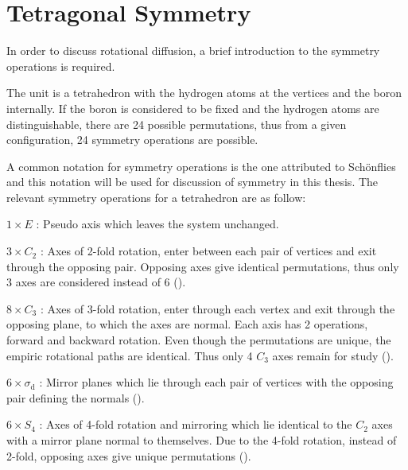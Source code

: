 \section{Tetragonal Symmetry}
\label{sec:symmetry}
In order to discuss rotational diffusion, a brief introduction to the  symmetry operations is required.

The  unit is a tetrahedron with the hydrogen atoms at the vertices and the boron internally.
If the boron is considered to be fixed and the hydrogen atoms are distinguishable, there are 24 possible permutations, thus from a given configuration, 24 symmetry operations are possible.

A common notation for symmetry operations is the one attributed to Sch\"onflies~\cite{schonflies-notation-1889} and this notation will be used for discussion of symmetry in this thesis. %
The relevant symmetry operations for a tetrahedron are as follow:
\bit
\item $1 \times E$ : Pseudo axis which leaves the system unchanged.
\item $3 \times C_2$ : Axes of 2-fold rotation, enter between each pair of vertices and exit through the opposing pair.
Opposing axes give identical permutations, thus only 3 axes are considered instead of 6 ().
\item $8 \times C_3$ : Axes of 3-fold rotation, enter through each vertex and exit through the opposing plane, to which the axes are normal. Each axis has 2 operations, forward and backward rotation.
Even though the permutations are unique, the empiric rotational paths are identical.
Thus only 4 $C_3$ axes remain for study ().
\item $6 \times \sigma_\text{d}$ : Mirror planes which lie through each pair of vertices with the opposing pair defining the normals ().
\item $6 \times S_4$ : Axes of 4-fold rotation and mirroring which lie identical to the $C_2$ axes with a mirror plane normal to themselves. Due to the 4-fold rotation, instead of 2-fold, opposing axes give unique permutations ().
\eit

